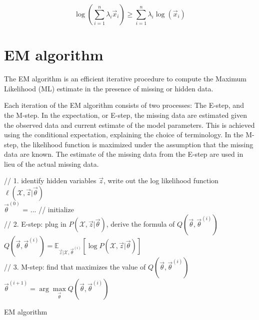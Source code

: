 \begin{proposition}
\begin{equation}
\log\left(\sum\limits_{i=1}^n \lambda_i\vec{x}_i\right) \geq \sum\limits_{i=1}^n {\lambda_i \log(\vec{x}_i)}
\end{equation}
\end{proposition}


\section{EM algorithm}
The EM algorithm is an efficient iterative procedure to compute the Maximum Likelihood (ML) estimate in the presence of missing or hidden data. 

Each iteration of the EM algorithm consists of two processes: The E-step, and the M-step. In the expectation, or E-step, the missing data are estimated given the observed data and current estimate of the model parameters. This is achieved using the conditional expectation, explaining the choice of terminology. In the M-step, the likelihood function is maximized under the assumption that the missing data are known. The estimate of the missing data from the E-step are used in lieu of the actual missing data.

\begin{algorithm}[htbp]
    \SetAlgoNoLine

	// 1. identify hidden variables $\vec{z}$, write out the log likelihood function $\ell(\mathcal{X},\vec{z}|\vec{\theta})$ \\
	$\vec{\theta}^{(0)}$ = ... // initialize \\
	
	 {
	    // 2. E-step: plug in $P(\mathcal{X},\vec{z}|\vec{\theta})$, derive the formula of $Q(\vec{\theta}, \vec{\theta}^{(i)})$ \\
	    $Q(\vec{\theta}, \vec{\theta}^{(i)})=\mathbb{E}_{\vec{z}|\mathcal{X},\vec{\theta}^{(i)}}\left[\log P(\mathcal{X},\vec{z}|\vec{\theta})\right]$ \\
	    // 3. M-step: find \vec{\theta} that maximizes the value of $Q(\vec{\theta}, \vec{\theta}^{(i)})$ \\
		$\vec{\theta}^{(i+1)}=\arg\max\limits_{\vec{\theta}} Q(\vec{\theta}, \vec{\theta}^{(i)})$ \\
	}
	
\caption{EM algorithm}
\end{algorithm}

